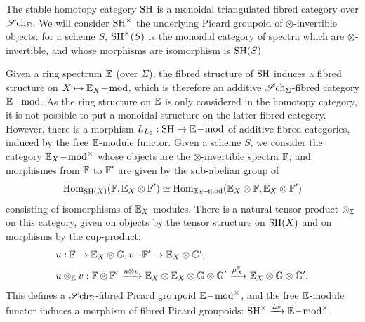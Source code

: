 \begin{num}
The stable homotopy category $\operatorname{SH}$ is a monoidal triangulated fibred category over $\operatorname{\mathscr Sch_\Sigma}$.
We will consider $\operatorname{SH}^\times$ the underlying Picard groupoid of $\otimes$-invertible objects:
for a scheme $S$, $\operatorname{SH}^\times(S)$ is the monoidal category of spectra which are $\otimes$-invertible,
and whose morphisms are isomorphism is $\operatorname{SH}(S)$.

Given a ring spectrum $\mathbb E$ (over $\Sigma$), the fibred structure of $\operatorname{SH}$ induces
a fibred structure on $X \mapsto \mathbb E_X\!-\!\operatorname{mod}$, which is therefore an additive $\operatorname{\mathscr Sch_\Sigma}$-fibred category $\mathbb E\!-\!\operatorname{mod}$.
As the ring structure on $\mathbb E$ is only considered in the homotopy category,
it is not possible to put a monoidal structure on the latter fibred category. However,
there is a morphism $L_{L_\mathbb E}:\operatorname{SH} \rightarrow \mathbb E\!-\!\operatorname{mod}$ of additive fibred categories, induced by the
free $\mathbb E$-module functor. Given a scheme $S$, we consider the category $\mathbb E_X\!-\!\operatorname{mod}^\times$
whose objects are the $\otimes$-invertible spectra $\mathbb F$, and morphismes from $\mathbb F$ to $\mathbb F'$ are given 
by the sub-abelian group of
$$
\operatorname{Hom}_{\operatorname{SH}(X)}(\mathbb F,\mathbb E_X \otimes \mathbb F') \simeq \operatorname{Hom}_{\mathbb E_X\!-\!\operatorname{mod}}(\mathbb E_X \otimes \mathbb F,\mathbb E_X \otimes \mathbb F')
$$
consisting of isomorphisms of $\mathbb E_X$-modules.
There is a natural tensor product $\otimes_\mathbb E$ on this category, given on objects by the tensor structure
on $\operatorname{SH}(X)$ and on morphisms by the cup-product:
\begin{align*}
&u:\mathbb F \rightarrow \mathbb E_X \otimes \mathbb G, v:\mathbb F' \rightarrow \mathbb E_X \otimes \mathbb G', \\
& u \otimes_\mathbb E v:\mathbb F \otimes \mathbb F' \xrightarrow{u \otimes v} \mathbb E_X \otimes \mathbb E_X \otimes \mathbb G \otimes \mathbb G'
\xrightarrow{\mu_X^\mathbb E} \mathbb E_X \otimes \mathbb G \otimes \mathbb G'.
\end{align*}
This defines a $\operatorname{\mathscr Sch_\Sigma}$-fibred Picard groupoid $\mathbb E\!-\!\operatorname{mod}^\times$, and the free $\mathbb E$-module functor
induces a morphism of fibred Picard groupoids: $\operatorname{SH}^\times \xrightarrow{L_\mathbb E} \mathbb E\!-\!\operatorname{mod}^\times$.
\end{num}
